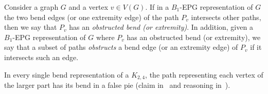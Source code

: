 \documentclass[runningheads]{llncs}
\begin{document}



\vspace{-0.5cm}
\vspace{-0.5cm}
\begin{definition}
Consider a graph $G$ and a vertex $v \in V(G)$. If in a $B_1$-EPG representation of $G$ the two bend edges (or one extremity edge) of the path $P_{v}$ intersects other paths, then we say that $P_{v}$ has an \emph{obstructed bend (or extremity)}. 
In addition, given a $B_1$-EPG representation of $G$ where $P_{v}$ has an obstructed bend (or extremity), we say that a subset of paths \emph{obstructs} a bend edge (or an extremity edge) of $P_{v}$ if it intersects such an edge. 
\end{definition}


\begin{remark} \label{fact:k24facts}
In every single bend representation of a $K_{2,4}$, the path representing each vertex of the larger part has its bend in a false pie (claim in~\cite{daniel2014b} and reasoning in~\cite{Asinowski2009}).
\end{remark} %




\end{document}
